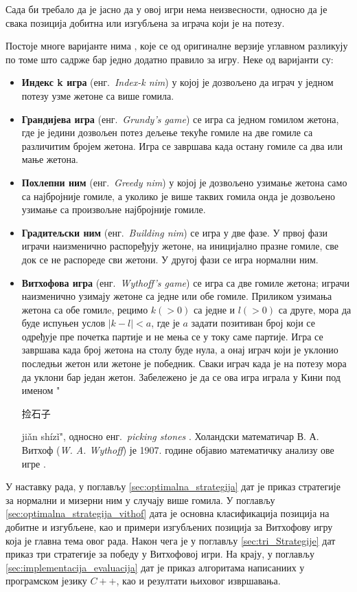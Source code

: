 \documentclass[a4paper]{article}
\begin{document}
Сада би требало да је јасно да у овој игри нема неизвесности, односно да је свака позиција добитна или изгубљена за играча који је на потезу.

Постоје многе варијанте нима \cite{hitotsumatsu1968mathematics, ho2011combinatorial}, које се од оригиналне верзије углавном разликују по томе што садрже бар једно додатно правило за игру. Неке од варијанти су:
\begin{itemize}
	\item \textbf{Индекс k игра} (енг.{~\em Index-k nim}) у којој је дозвољено да играч у једном потезу узме жетоне са више гомила. 
	\item \textbf{Грандијева игра} (енг.{~\em Grundy's game}) се игра са једном гомилом жетона, где је једини дозвољен потез дељење текуће гомиле на две гомиле са различитим бројем жетона. Игра се завршава када остану гомиле са два или мање жетона.
	\item \textbf{Похлепни ним} (енг.{~\em Greedy nim}) у којој је дозвољено узимање жетона само са најбројније гомиле, а уколико је више таквих гомила онда је дозвољено узимање са произвољне најбројније гомиле.
	\item \textbf{Градитељски ним} (енг.{~\em Building nim}) се игра у две фазе. У првој фази играчи наизменично распоређују жетоне, на иницијално празне гомиле, све док се не распореде сви жетони. У другој фази се игра нормални ним. 
	\item \textbf{Витхофова игра} (енг.{~\em Wythoff's game}) се игра са две гомиле жетона; играчи наизменично узимају жетоне са једне или обе гомиле. Приликом узимања жетона са обе гомилe, рецимо $ k (> 0) $ са једне и $ l (> 0) $ са друге, мора да буде испуњен услов $ |k - l| < a $, где је $ a $ задати позитиван број који се одређује пре почетка партије и не мења се у току саме партије. Игра се завршава када број жетона на столу буде нула, а онај играч који је уклонио последњи жетон или жетоне је победник. Сваки играч када је на потезу мора да уклони бар један жетон. Забележено је да се ова игра играла у Кини  под именом "\begin{CJK}{UTF8}{gbsn}捡石子\end{CJK} jiǎn shízǐ", односно енг.{~\em picking stones} \cite{Yaglom}. Холандски математичар В. А. Витхоф (\textit{W. A. Wythoff}) је 1907. године објавио математичку анализу ове игре \cite{wythoff1907modification}. 
\end{itemize}

У наставку рада, у поглављу \ref{sec:optimalna_strategija} дат је приказ стратегије за нормални и мизерни ним у случају више гомила. У поглављу \ref{sec:optimalna_strategija_vithof} дата је основна класификација позиција на добитне и изгубљене, као и примери изгубљених позиција за Витхофову игру која је главна тема овог рада. Након чега је у поглављу \ref{sec:tri_Strategije} дат приказ три стратегије за победу у Витхофовој игри. На крају, у поглављу \ref{sec:implementacija_evaluacija} дат је приказ алгоритама написаниих у програмском језику $ C++ $, као и резултати њиховог извршавања.
\end{document}
